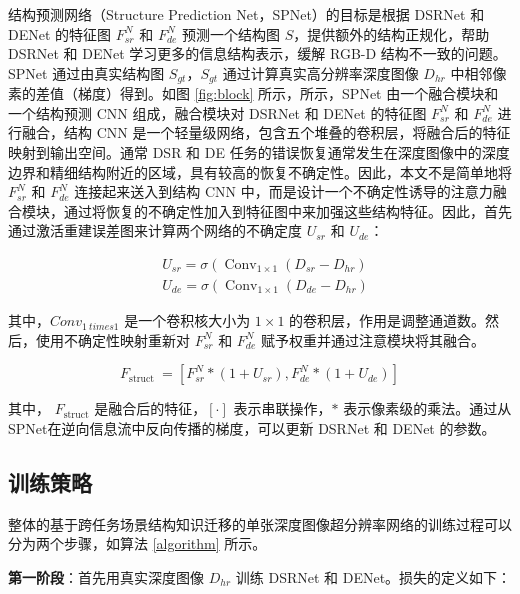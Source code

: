 \documentclass{vip-theme}
\begin{document}
\begin{sloppypar}
结构预测网络（Structure Prediction Net，SPNet）的目标是根据 DSRNet 和 DENet 的特征图 $F_{sr}^N$ 和 $F_{de}^N$ 预测一个结构图 $S$，提供额外的结构正规化，帮助 DSRNet 和 DENet 学习更多的信息结构表示，缓解 RGB-D 结构不一致的问题。SPNet 通过由真实结构图 $S_{gt}$，$S_{gt}$ 通过计算真实高分辨率深度图像 $D_{hr}$ 中相邻像素的差值（梯度）得到。如图 \ref{fig:block} 所示，所示，SPNet 由一个融合模块和一个结构预测 CNN 组成，融合模块对 DSRNet 和 DENet 的特征图 $F_{sr}^N$ 和 $F_{de}^N$ 进行融合，结构 CNN 是一个轻量级网络，包含五个堆叠的卷积层，将融合后的特征映射到输出空间。通常 DSR 和 DE 任务的错误恢复通常发生在深度图像中的深度边界和精细结构附近的区域，具有较高的恢复不确定性。因此，本文不是简单地将 $F_{sr}^N$ 和 $F_{de}^N$ 连接起来送入到结构 CNN 中，而是设计一个不确定性诱导的注意力融合模块，通过将恢复的不确定性加入到特征图中来加强这些结构特征。因此，首先通过激活重建误差图来计算两个网络的不确定度 $U_{sr}$ 和 $U_{de}$：
 
\begin{equation}
\begin{aligned}
&U_{s r}=\sigma\left(\operatorname{Conv}_{1 \times 1}\left(D_{s r}-D_{h r}\right)\right. \\
&U_{d e}=\sigma\left(\operatorname{Conv}_{1 \times 1}\left(D_{d e}-D_{h r}\right)\right.
\end{aligned}
\end{equation}

其中，$Conv_{1 \ times 1}$ 是一个卷积核大小为 $1 \times 1$ 的卷积层，作用是调整通道数。然后，使用不确定性映射重新对  $F_{sr}^N$ 和 $F_{de}^N$ 赋予权重并通过注意模块将其融合。

\begin{equation}
F_{\text {struct }}=\left[F_{s r}^{N} *\left(1+U_{s r}\right), F_{d e}^{N} *\left(1+U_{d e}\right)\right]
\end{equation}

其中， $F_{\text {struct}}$ 是融合后的特征，$[\cdot]$ 表示串联操作，$*$ 表示像素级的乘法。通过从 SPNet在逆向信息流中反向传播的梯度，可以更新 DSRNet 和 DENet 的参数。

\subsection{训练策略}
 
整体的基于跨任务场景结构知识迁移的单张深度图像超分辨率网络的训练过程可以分为两个步骤，如算法 \ref{algorithm} 所示。
 
\textbf{第一阶段}：首先用真实深度图像 $D_{hr}$ 训练 DSRNet 和 DENet。损失的定义如下：


\end{sloppypar}
\end{document}

